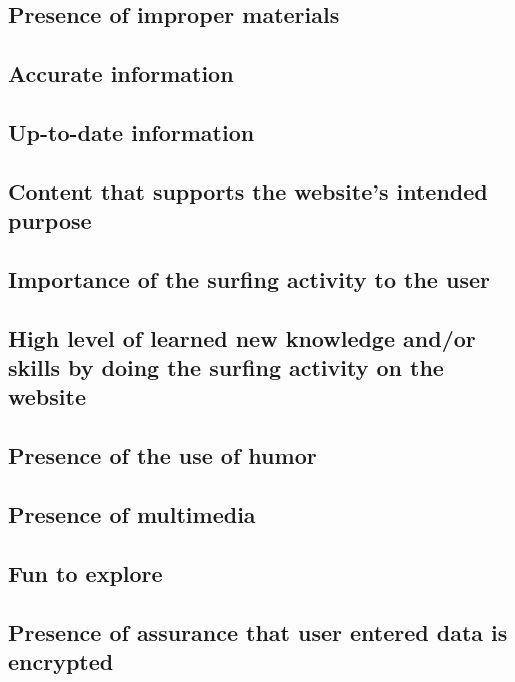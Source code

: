         \subsection{Presence of improper materials}

        \subsection{Accurate information}

        \subsection{Up-to-date information}

        \subsection{Content that supports the website's intended purpose}

        \subsection{Importance of the surfing activity to the user}

        \subsection{High level of learned new knowledge and/or skills by doing the surfing activity on the website}

        \subsection{Presence of the use of humor}

        \subsection{Presence of multimedia}

        \subsection{Fun to explore}

        \subsection{Presence of assurance that user entered data is encrypted}


